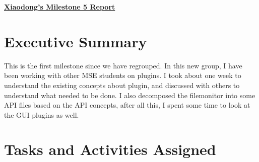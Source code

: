 \begin{center}
{\large\textbf{\underline{{Xiaodong's Milestone 5 Report}}}}
\end{center}

\section*{Executive Summary}

This is the first milestone since we have regrouped. In this new group, I have been working with other MSE students on plugins. I took about one week to understand the existing concepts about plugin, and discussed with others to understand what needed to be done. I also decomposed the filemonitor into some API files based on the API concepts, after all this, I spent some time to look at the GUI plugins as well.

\section*{Tasks and Activities Assigned}

